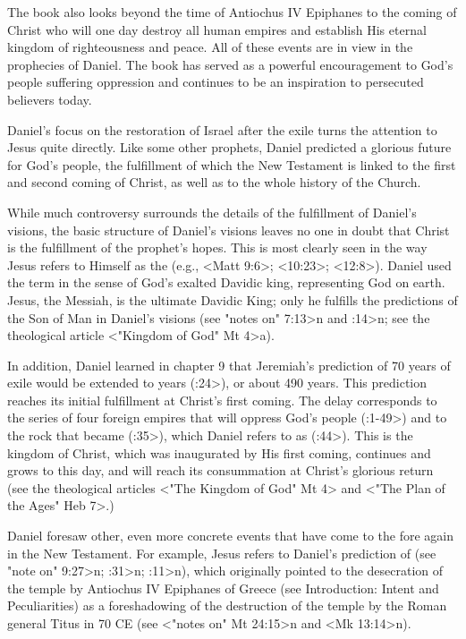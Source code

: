 The book also looks beyond the time of Antiochus IV Epiphanes to the coming of Christ who will one day destroy all human empires and establish His eternal kingdom of righteousness and peace. All of these events are in view in the prophecies of Daniel.
The book has served as a powerful encouragement to God's people suffering oppression and continues to be an inspiration to persecuted believers today. 



Daniel's focus on the restoration of Israel after the exile turns the attention to Jesus quite directly.
Like some other prophets, Daniel predicted a glorious future for God's people, the fulfillment of which the New Testament 
is linked to the first and second coming of Christ, as well as to the whole history of the Church.

While much controversy surrounds the details of the fulfillment of Daniel's visions, the basic structure of Daniel's visions leaves no one in doubt that Christ is the fulfillment of the prophet's hopes.
This is most clearly seen in the way Jesus refers to Himself as the  (e.g., <Matt 9:6>; <10:23>; <12:8>).
Daniel used the term in the sense of God's exalted Davidic king, representing God on earth.
Jesus, the Messiah, is the ultimate Davidic King; only he fulfills the predictions of the Son of Man in Daniel's visions (see \<"notes on" 7:13>n and :14>n; see the theological article 
<"Kingdom of God" Mt 4>a). 

In addition, Daniel learned in chapter 9 that Jeremiah's prediction of 70 years of exile would be extended 
to  years (:24>), or about 490 years.
This prediction reaches its initial fulfillment at Christ's first coming. The delay corresponds to the series of four foreign empires that will oppress God's people (:1-49>) and to the rock that became  (:35>), which Daniel refers to as  (:44>). 
This is the kingdom of Christ, which was inaugurated by His first coming, continues and grows to this day, and will reach its consummation at Christ's glorious return (see the theological articles <"The Kingdom of God"  Mt 4> and <"The Plan of the Ages"  Heb 7>.)

Daniel foresaw other, even more concrete events that have come to the fore again in the New Testament.
For example, Jesus refers to Daniel's prediction of  (see \<"note on" 9:27>n; :31>n; :11>n),
which originally pointed to the desecration of the temple by Antiochus IV Epiphanes of Greece (see Introduction: Intent and Peculiarities) as a foreshadowing of the destruction of the temple by the Roman general Titus in 70 CE (see <"notes on" Mt 24:15>n and <Mk 13:14>n).


